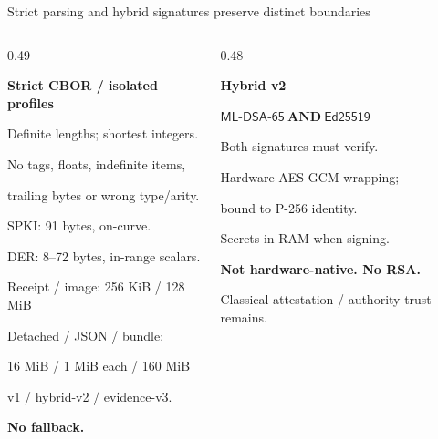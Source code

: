\begin{frame}[noframenumbering]{Strict parsing and hybrid signatures preserve distinct boundaries}
\begin{columns}[T,onlytextwidth]
\begin{column}{0.49\textwidth}
\begin{pitchcard}
\textbf{Strict CBOR / isolated profiles}\par\vspace{0.15cm}
{\small
Definite lengths; shortest integers.\par
No tags, floats, indefinite items,\par trailing bytes or wrong type/arity.\par\vspace{0.15cm}
SPKI: 91 bytes, on-curve.\par
DER: 8--72 bytes, in-range scalars.\par\vspace{0.15cm}
Receipt / image: 256 KiB / 128 MiB\par
Detached / JSON / bundle:\par 16 MiB / 1 MiB each / 160 MiB\par\vspace{0.15cm}
v1 / hybrid-v2 / evidence-v3.\par\textbf{No fallback.}\par}
\end{pitchcard}
\end{column}
\begin{column}{0.48\textwidth}
\begin{pitchcard}
\textbf{Hybrid v2}\par\vspace{0.2cm}
{\small\(\mathsf{ML\text{-}DSA\text{-}65}\ \mathbf{AND}\ \mathsf{Ed25519}\)}\par\vspace{0.15cm}
Both signatures must verify.\par
Hardware AES-GCM wrapping;\par bound to P-256 identity.\par\vspace{0.2cm}
Secrets in RAM when signing.\par
\textbf{Not hardware-native. No RSA.}\par\vspace{0.2cm}
Classical attestation / authority trust remains.
\end{pitchcard}
\end{column}
\end{columns}
\end{frame}

